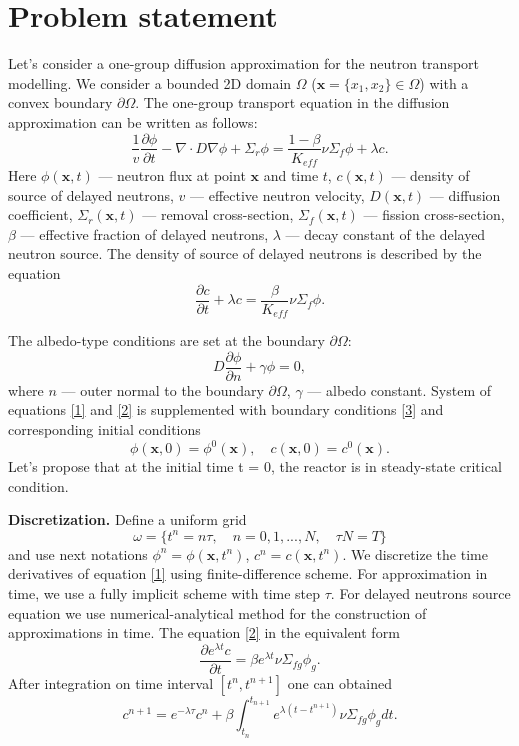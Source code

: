 \documentclass[10pt]{article}
\begin{document}
\section{Problem statement}
Let's consider a one-group diffusion approximation \cite{Stacey2007} for the neutron transport modelling.
We consider a bounded 2D domain  $\Omega$ ($\bm x = \{x_1, x_2\} \in \Omega$) with a convex boundary $\partial \Omega$.
The one-group transport equation in the diffusion approximation can be written as follows:
\begin{equation} \label{1}
	\frac{1}{v} \frac{\partial \phi}{\partial t} - \nabla \cdot D \nabla \phi + \Sigma_r \phi
	= \frac{1 - \beta}{K_{eff}} \nu \Sigma_f \phi + \lambda c.
\end{equation}
Here $\phi(\bm x,t)$ --- neutron flux at point $\bm x$ and time $t$,
$c(\bm x,t)$ --- density of source of delayed neutrons,
$v$ --- effective neutron velocity,
$D(\bm x, t)$ --- diffusion coefficient,
$\Sigma_r(\bm x,t)$ --- removal cross-section,
$\Sigma_f(\bm x,t)$ --- fission cross-section,
$\beta$ --- effective fraction of delayed neutrons,
$\lambda$ --- decay constant of the delayed neutron source.
The density of source of delayed neutrons is described by the equation
\begin{equation} \label{2}
	\frac{\partial c}{\partial t} + \lambda c = \frac{\beta}{K_{eff}} \nu \Sigma_f \phi.
\end{equation}

The albedo-type conditions are set at the boundary $\partial \Omega$:
\begin{equation} \label{3}
	D \frac{\partial \phi}{\partial n} + \gamma \phi = 0,
\end{equation}
where $n$ --- outer normal to the boundary $\partial \Omega$, $\gamma$ --- albedo constant.
System of equations \eqref{1} and \eqref{2} is supplemented with boundary conditions \eqref{3} and corresponding initial conditions
\begin{equation} \label{4}
	\phi(\bm x, 0) = \phi^0(\bm x), \quad c(\bm x, 0) = c^0(\bm x).
\end{equation}
Let's propose that at the initial time t = 0, the reactor is in steady-state critical condition.

\textbf{Discretization.}
Define a uniform grid
\[
	\omega = \{ t^n = n \tau, \quad n = 0,1,...,N, \quad \tau N = T \}
\]
and use next notations $\phi^n = \phi(\bm{x}, t^n)$, $c^n = c(\bm{x}, t^n)$.
We discretize the time derivatives of equation \eqref{1} using finite-difference scheme.
For approximation in time, we use a fully implicit scheme with time step $\tau$.
For delayed neutrons source equation we use numerical-analytical method for the construction of approximations in time.
The equation \eqref{2} in the equivalent form
\[
	\frac{\partial e^{\lambda t} c}{\partial t} =
	\beta e^{\lambda t} \nu \Sigma_{fg} \phi_g.
\]
After integration on time interval $[t^n, t^{n+1}]$ one can obtained
\begin{equation} \label{5}
	c^{n+1} = e^{-\lambda \tau} c^n +
	\beta \int_{t_n}^{t_{n + 1}} e^{\lambda (t - t^{n + 1})} \nu \Sigma_{fg} \phi_g d t.
\end{equation}
\end{document}
